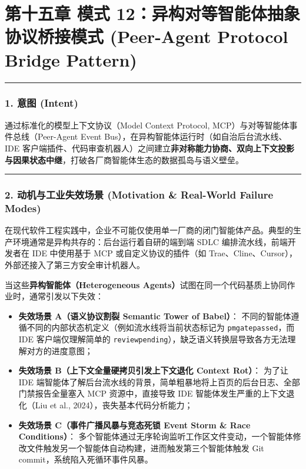 \documentclass[
]{ctexart}
\providecommand{\tightlist}{%
  \setlength{\itemsep}{0pt}\setlength{\parskip}{0pt}}
\renewcommand{\_}{\discretionary{}{}{\textunderscore}}
\let\oldsection\section
\renewcommand{\section}{\clearpage\oldsection}
\begin{document}
\section{第十五章 模式 12：异构对等智能体抽象协议桥接模式 (Peer-Agent Protocol
Bridge
Pattern)}\label{ux6a21ux5f0f-12ux5f02ux6784ux5bf9ux7b49ux667aux80fdux4f53ux62bdux8c61ux534fux8baeux6865ux63a5ux6a21ux5f0f-peer-agent-protocol-bridge-pattern}

\begin{center}\rule{0.5\linewidth}{0.5pt}\end{center}

\subsubsection{1. 意图 (Intent)}\label{ux610fux56fe-intent-11}

通过标准化的模型上下文协议（Model Context Protocol,
MCP）与对等智能体事件总线（Peer-Agent Event
Bus），在异构智能体运行时（如自治后台流水线、IDE
客户端插件、代码审查机器人）之间建立\textbf{非对称能力协商、双向上下文投影与因果状态中继}，打破各厂商智能体生态的数据孤岛与语义壁垒。

\begin{center}\rule{0.5\linewidth}{0.5pt}\end{center}

\subsubsection{2. 动机与工业失效场景 (Motivation \& Real-World Failure
Modes)}\label{ux52a8ux673aux4e0eux5de5ux4e1aux5931ux6548ux573aux666f-motivation-real-world-failure-modes-11}

在现代软件工程实践中，企业不可能仅使用单一厂商的闭门智能体产品。典型的生产环境通常是异构共存的：后台运行着自研的端到端
SDLC 编排流水线，前端开发者在 IDE 中使用基于 MCP 或自定义协议的插件（如
Trae、Cline、Cursor），外部还接入了第三方安全审计机器人。

当这些\textbf{异构智能体（Heterogeneous
Agents）}试图在同一个代码基质上协同作业时，通常引发以下失效：

\begin{itemize}
\tightlist
\item
  \textbf{失效场景 A（语义协议割裂 Semantic Tower of Babel）}：
  不同的智能体遵循不同的内部状态机定义（例如流水线将当前状态标记为
  \texttt{pm\_gate\_passed}，而 IDE 客户端仅理解简单的
  \texttt{review\_pending}），缺乏语义转换层导致各方无法理解对方的进度意图；
\item
  \textbf{失效场景 B（上下文全量硬拷贝引发上下文退化 Context Rot）}：
  为了让 IDE
  端智能体了解后台流水线的背景，简单粗暴地将上百页的后台日志、全部门禁报告全量塞入
  MCP 资源中，直接导致 IDE 智能体发生严重的上下文退化（Liu et al.,
  2024），丧失基本代码分析能力；
\item
  \textbf{失效场景 C（事件广播风暴与竞态死锁 Event Storm \& Race
  Conditions）}：
  多个智能体通过无序轮询监听工作区文件变动，一个智能体修改文件触发另一个智能体自动构建，进而触发第三个智能体触发
  Git commit，系统陷入死循环事件风暴。
\end{itemize}
\end{document}
